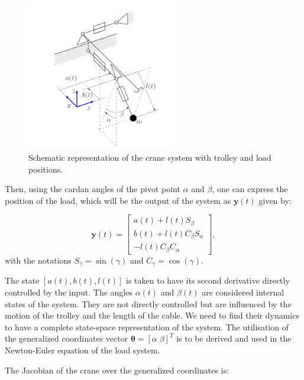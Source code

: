 \begin{figure}[htbp]
    \centering
    \includegraphics[width=0.6\textwidth]{imgs/section1/3DimCranSchem.PNG}
    \caption{Schematic representation of the crane system with trolley and load positions.}
    \label{fig:Crane_Schema}
\end{figure}

Then, using the cardan angles of the pivot point \(\alpha\) and \(\beta\), one can express the 
position of the load, which will be the output of the system as \(\textbf{y}(t)\) given by:

\begin{equation}
    \textbf{y}(t) = \begin{bmatrix}
        a(t) + l(t)S_\beta \\
        b(t) + l(t)C_\beta S_\alpha \\
        -l(t)C_\beta C_\alpha
    \end{bmatrix},
\end{equation}
with the notations \(S_\gamma = \sin(\gamma)\) and \(C_\gamma = \cos(\gamma)\).

The state \([a(t), b(t), l(t)]\) is taken to have its second derivative directly controlled by the input.
The angles \(\alpha(t)\) and \(\beta(t)\)  are considered internal states of the system. They are not directly controlled but are influenced by the motion of the trolley and the length of the cable.
We need to find their dynamics to have a complete state-space representation of the system. The utilisation of the
generalized coordinates vector \(\boldsymbol{\theta} = \left[ \alpha \; \beta \right]^T\) is to be derived
and used in the Newton-Euler equation of the load system. 

The Jacobian of the crane over the generalized coordinates is:

